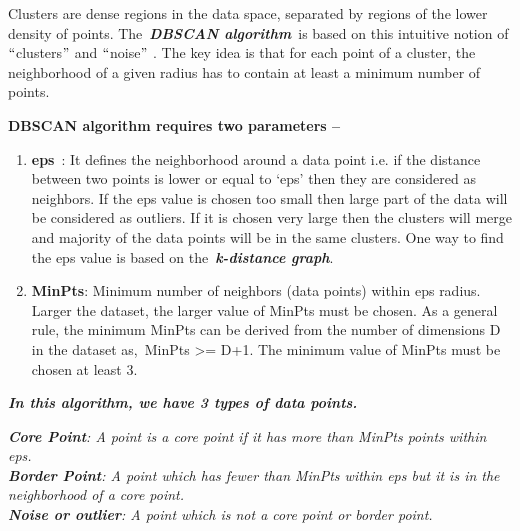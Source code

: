 \documentclass[12pt]{article}
\renewcommand{\_}{\kern-1.5pt\textunderscore\kern-1.5pt}
\begin{document}
Clusters are dense regions in the data space, separated by regions of the lower density of points. The \textbf{\textit{DBSCAN algorithm}} is based on this intuitive notion of $``$clusters$"$  and $``$noise$"$ . The key idea is that for each point of a cluster, the neighborhood of a given radius has to contain at least a minimum number of points.\par

\textbf{DBSCAN algorithm requires two parameters –}\par

\begin{enumerate}[label*=\arabic*.]
	\item \textbf{eps} : It defines the neighborhood around a data point i.e. if the distance between two points is lower or equal to ‘eps’ then they are considered as neighbors. If the eps value is chosen too small then large part of the data will be considered as outliers. If it is chosen very large then the clusters will merge and majority of the data points will be in the same clusters. One way to find the eps value is based on the \textbf{\textit{k-distance graph}}.\par

	\item \textbf{MinPts}: Minimum number of neighbors (data points) within eps radius. Larger the dataset, the larger value of MinPts must be chosen. As a general rule, the minimum MinPts can be derived from the number of dimensions D in the dataset as, MinPts >= D+1. The minimum value of MinPts must be chosen at least 3.\\

\end{enumerate}\par

\begin{adjustwidth}{0.38in}{0.0in}
\textbf{\textit{In this algorithm, we have 3 types of data points.}}\par

\end{adjustwidth}

\begin{adjustwidth}{0.38in}{0.0in}
\textbf{\textit{Core Point}}\textit{: A point is a core point if it has more than MinPts points within eps.\\
\textbf{Border Point}: A point which has fewer than MinPts within eps but it is in the neighborhood of a core point.\\
\textbf{Noise or outlier}: A point which is not a core point or border point.}\par

\end{adjustwidth}
\end{document}
